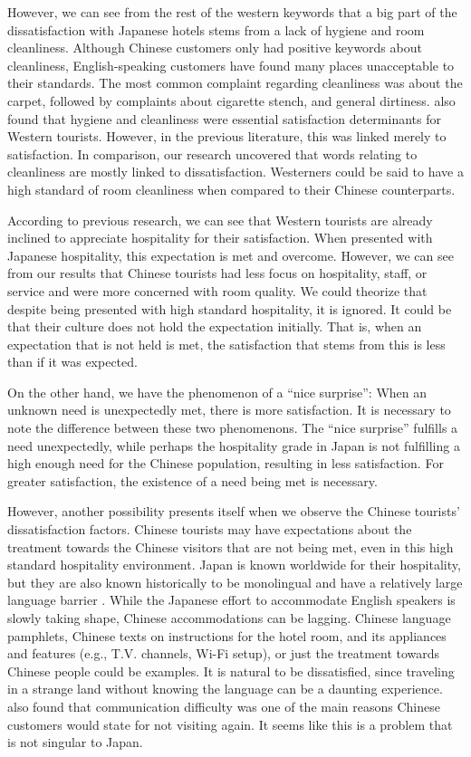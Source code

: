 \documentclass[smallextended,natbib]{svjour3}       %
\begin{document}
However, we can see from the rest of the western keywords that a big part of the dissatisfaction with Japanese hotels stems from a lack of hygiene and room cleanliness. Although Chinese customers only had positive keywords about cleanliness, English-speaking customers have found many places unacceptable to their standards. The most common complaint regarding cleanliness was about the carpet, followed by complaints about cigarette stench, and general dirtiness. \cite{kozak2002} also found that hygiene and cleanliness were essential satisfaction determinants for Western tourists. However, in the previous literature, this was linked merely to satisfaction. In comparison, our research uncovered that words relating to cleanliness are mostly linked to dissatisfaction. Westerners could be said to have a high standard of room cleanliness when compared to their Chinese counterparts. 

According to previous research, we can see that Western tourists are already inclined to appreciate hospitality for their satisfaction. When presented with Japanese hospitality, this expectation is met and overcome. However, we can see from our results that Chinese tourists had less focus on hospitality, staff, or service and were more concerned with room quality. We could theorize that despite being presented with high standard hospitality, it is ignored. It could be that their culture does not hold the expectation initially. That is, when an expectation that is not held is met, the satisfaction that stems from this is less than if it was expected.

On the other hand, we have the phenomenon of a ``nice surprise'': When an unknown need is unexpectedly met, there is more satisfaction. It is necessary to note the difference between these two phenomenons. The ``nice surprise'' fulfills a need unexpectedly, while perhaps the hospitality grade in Japan is not fulfilling a high enough need for the Chinese population, resulting in less satisfaction. For greater satisfaction, the existence of a need being met is necessary. 

However, another possibility presents itself when we observe the Chinese tourists' dissatisfaction factors. Chinese tourists may have expectations about the treatment towards the Chinese visitors that are not being met, even in this high standard hospitality environment. Japan is known worldwide for their hospitality, but they are also known historically to be monolingual and have a relatively large language barrier \cite{heinrich2012making, coulmas2002japan}. While the Japanese effort to accommodate English speakers is slowly taking shape, Chinese accommodations can be lagging. Chinese language pamphlets, Chinese texts on instructions for the hotel room, and its appliances and features (e.g., T.V. channels, Wi-Fi setup), or just the treatment towards Chinese people could be examples. It is natural to be dissatisfied, since traveling in a strange land without knowing the language can be a daunting experience. \cite{ryan2001} also found that communication difficulty was one of the main reasons Chinese customers would state for not visiting again. It seems like this is a problem that is not singular to Japan.
\end{document}
